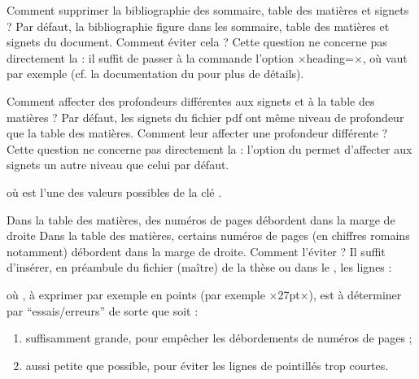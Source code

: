 \begin{dbfaq}{Comment supprimer la bibliographie des sommaire, table des
    matières et signets ?}{}
  Par défaut, la bibliographie figure dans les sommaire, table des matières et
  signets du document. Comment éviter cela ?
  \tcblower
  Cette question ne concerne pas directement la \yatcl{} : il suffit de passer
  à la commande  l'option
  ×heading=×, où  vaut par exemple
   (cf. la documentation du  pour
  plus de détails).
\end{dbfaq}

\begin{dbfaq}{Comment affecter des profondeurs différentes aux signets et à la
    table des matières ?}{}
  Par défaut, les signets du fichier \acrshort{pdf} ont même niveau de
  profondeur que la table des matières. Comment leur affecter une profondeur
  différente ?
  \tcblower
  Cette question ne concerne pas directement la \yatcl{} : l'option
   du  permet d'affecter aux
  signets un autre niveau que celui par défaut.
\begin{preamblecode}[title=Par exemple dans le \File{\configurationfile}]
\end{preamblecode}
où  est l'une des valeurs possibles de la clé
.
\end{dbfaq}

\begin{dbfaq}{Dans la table des matières, des numéros de pages débordent dans
    la marge de droite}{}
  Dans la table des matières, certains numéros de pages (en chiffres romains
  notamment) débordent dans la marge de droite. Comment l'éviter ?
  \tcblower
  Il suffit d'insérer, en préambule du fichier (maître) de la thèse ou dans le
  \File{\configurationfile}, les lignes :
\begin{preamblecode}
\makeatletter
\renewcommand*\@pnumwidth{÷\meta{distance}÷}
\makeatother
\end{preamblecode}
  où , à exprimer par exemple en points (par exemple ×27pt×),
  est à déterminer par \enquote{essais/erreurs} de sorte que 
  soit :
  \begin{enumerate}
  \item suffisamment grande, pour empêcher les débordements de numéros de
    pages ;
  \item aussi petite que possible, pour éviter les lignes de pointillés trop
    courtes.
  \end{enumerate}
\end{dbfaq}

